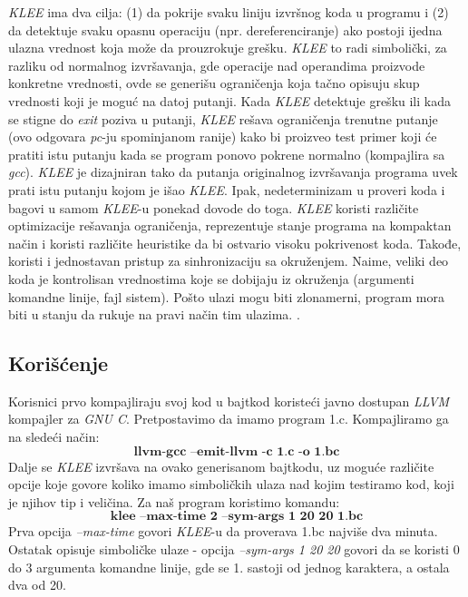\documentclass[a4paper]{article}
\begin{document}
\textit{KLEE} ima dva cilja: (1) da pokrije svaku liniju izvršnog koda u programu i (2) da detektuje svaku opasnu operaciju (npr. dereferenciranje) ako postoji ijedna ulazna vrednost koja može da prouzrokuje grešku. \textit{KLEE} to radi simbolički, za razliku od normalnog izvršavanja, gde operacije nad operandima proizvode konkretne vrednosti, ovde se generišu ograničenja koja tačno opisuju skup vrednosti koji je moguć na datoj putanji. Kada \textit{KLEE} detektuje grešku ili kada se stigne do \textit{exit} poziva u putanji, \textit{KLEE} rešava ograničenja trenutne putanje (ovo odgovara \textit{pc}-ju spominjanom ranije) kako bi proizveo test primer koji će pratiti istu putanju kada se program ponovo pokrene normalno (kompajlira sa \textit{gcc}). \textit{KLEE} je dizajniran tako da putanja originalnog izvršavanja programa uvek prati istu putanju kojom je išao \textit{KLEE}. Ipak, nedeterminizam u proveri koda i bagovi u samom \textit{KLEE}-u ponekad dovode do toga. \textit{KLEE} koristi različite optimizacije rešavanja ograničenja, reprezentuje stanje programa na kompaktan način i koristi različite heuristike da bi ostvario visoku pokrivenost koda. Takođe, koristi i jednostavan pristup za sinhronizaciju sa okruženjem. Naime, veliki deo koda je kontrolisan vrednostima koje se dobijaju iz okruženja (argumenti komandne linije, fajl sistem). Pošto ulazi mogu biti zlonamerni, program mora biti u stanju da rukuje na pravi način tim ulazima. \cite{klee}.

\subsection{Korišćenje}
\label{subsec:podnaslov1}
Korisnici prvo kompajliraju svoj kod u bajtkod koristeći javno dostupan \textit{LLVM} kompajler za \textit{GNU C}. Pretpostavimo da imamo program 1.c. Kompajliramo ga na sledeći način: 
\[\textbf{llvm-gcc --emit-llvm -c 1.c -o 1.bc}\] 
Dalje se \textit{KLEE} izvršava na ovako generisanom bajtkodu, uz moguće različite opcije koje govore koliko imamo simboličkih ulaza nad kojim testiramo kod, koji je njihov tip i veličina. Za naš program koristimo komandu: 
\[\textbf{klee --max-time 2 --sym-args 1 20 20 1.bc} \]
Prva opcija \textit{--max-time} govori \textit{KLEE}-u da proverava 1.bc najviše dva minuta. Ostatak opisuje simboličke ulaze - opcija \textit{--sym-args 1 20 20} govori da se koristi 0  do 3 argumenta komandne linije, gde se 1. sastoji od jednog  karaktera, a ostala dva od 20. 
\end{document}
